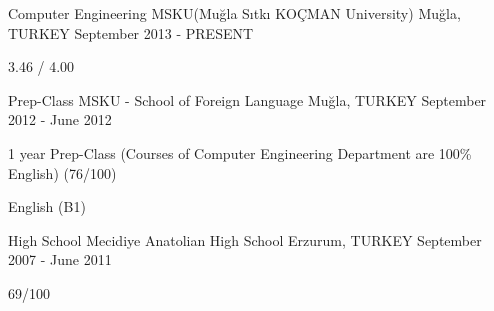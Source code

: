 \begin{cventries}
    \cventry
        {Computer Engineering}
        {MSKU(Muğla Sıtkı KOÇMAN University)}
        {Muğla, TURKEY}
        {September 2013 - PRESENT}
        {
            \begin {cvitems}
                \item {3.46 / 4.00}
            \end {cvitems}
        }

    \cventry
        {Prep-Class}
        {MSKU - School of Foreign Language }
        {Muğla, TURKEY}
        {September 2012 - June 2012}
        {
            \begin {cvitems}
                \item {1 year Prep-Class (Courses of Computer Engineering Department are 100\% English) (76/100)}
                \item {English (B1)}
            \end {cvitems}
        }
    \cventry
        {High School}
        {Mecidiye Anatolian High School}
        {Erzurum, TURKEY}
        {September 2007 - June 2011}
        {
            \begin {cvitems}
                \item {69/100}
            \end {cvitems}
        }

\end{cventries}
